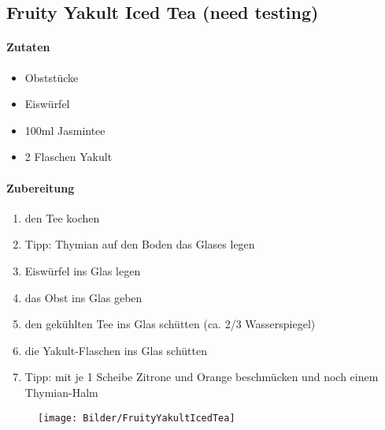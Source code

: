 \newpage
\subsection{Fruity Yakult Iced Tea (need testing)}
\paragraph{Zutaten}
\begin{itemize}[noitemsep]
	\item Obststücke
	\item Eiswürfel
	\item 100ml Jasmintee 
	\item 2 Flaschen Yakult
\end{itemize}
\paragraph{Zubereitung}
\begin{enumerate}[noitemsep]
	\item den Tee kochen
	\item Tipp: Thymian auf den Boden das Glases legen
	\item Eiswürfel ins Glas legen
	\item das Obst ins Glas geben
	\item den gekühlten Tee ins Glas schütten (ca. 2/3 Wasserspiegel)
	\item die Yakult-Flaschen ins Glas schütten
	\item Tipp: mit je 1 Scheibe Zitrone und Orange beschmücken und noch einem Thymian-Halm
\end{enumerate}
\begin{figure}[h]
\centering
\texttt{[image: Bilder/FruityYakultIcedTea]}
\end{figure}